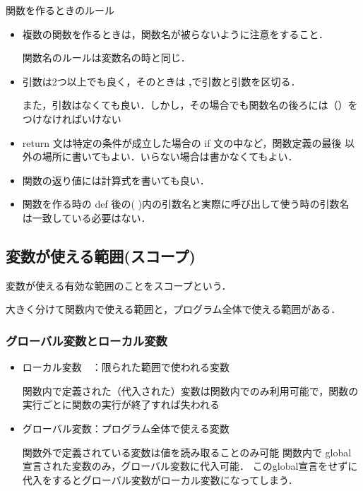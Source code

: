 \documentclass{jsarticle}
\begin{document}
\begin{itembox}[l]{関数を作るときのルール}
	\begin{itemize}
		\item{複数の関数を作るときは，関数名が被らないように注意をすること．\par
		            関数名のルールは変数名の時と同じ．}
		\item{引数は2つ以上でも良く，そのときは {\textbf {,}}で引数と引数を区切る．\par
		また，引数はなくても良い．しかし，その場合でも関数名の後ろには（）をつけなければいけない}
		\item{return 文は特定の条件が成立した場合の if 文の中など，関数定義の最後
		            以外の場所に書いてもよい．いらない場合は書かなくてもよい．}
		\item{関数の返り値には計算式を書いても良い． \par}
		\item{関数を作る時の def 後の( )内の引数名と実際に呼び出して使う時の引数名
		            は一致している必要はない．}
	\end{itemize}
\end{itembox}

\newpage

\subsection{変数が使える範囲(スコープ)}
変数が使える有効な範囲のことをスコープという． \par
大きく分けて関数内で使える範囲と，プログラム全体で使える範囲がある．
\subsubsection{グローバル変数とローカル変数}
\begin{itemize}
	\item {ローカル変数　：限られた範囲で使われる変数} \par
	      関数内で定義された（代入された）変数は関数内でのみ利用可能で，関数の実行ごとに関数の実行が終了すれば失われる

	\item {グローバル変数：プログラム全体で使える変数} \par
	      関数外で定義されている変数は値を読み取ることのみ可能
	      関数内で global 宣言された変数のみ，グローバル変数に代入可能．
	      このglobal宣言をせずに代入をするとグローバル変数がローカル変数になってしまう．
\end{itemize}
\end{document}
